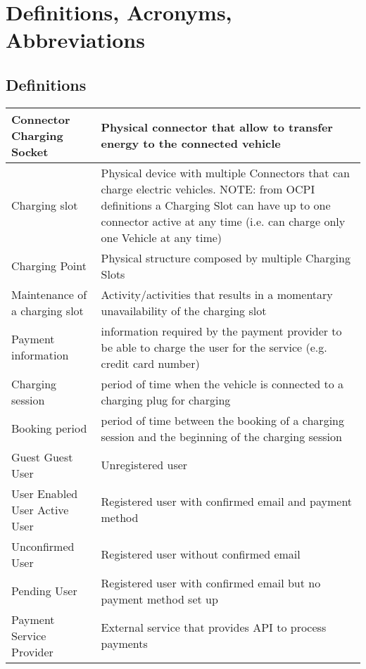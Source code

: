 \section{Definitions, Acronyms, Abbreviations}

\subsection{Definitions}
\begin{tabular}{|p{5cm}|p{10cm}|}
	\hline
	Connector \newline Charging Socket & Physical connector that allow to transfer energy to the connected vehicle\\
	\hline
	Charging slot & Physical device with multiple Connectors that can charge electric vehicles.\newline
	NOTE: from OCPI definitions a Charging Slot can have up to one connector active at any time (i.e. can charge only one Vehicle at any time) \\
	\hline
	Charging Point & Physical structure composed by multiple Charging Slots\\
	\hline
	Maintenance of a charging slot & Activity/activities that results in a momentary unavailability of the charging slot\\
	\hline
	Payment information & information required by the payment provider to be able to charge the user for the service (e.g. credit card number)\\
	\hline
	Charging session & period of time when the vehicle is connected to a charging plug for charging\\
	\hline
	Booking period & period of time between the booking of a charging session and the beginning of the charging session\\
	\hline
	{Guest \newline Guest User} & Unregistered user\\
	\hline
	{User \newline Enabled User \newline Active User} & Registered user with confirmed email and payment method\\
	\hline
	Unconfirmed User & Registered user without confirmed email\\
	\hline
	Pending User & Registered user with confirmed email but no payment method set up\\
	\hline
	Payment Service Provider & External service that provides API to process payments\\
	\hline
\end{tabular}

